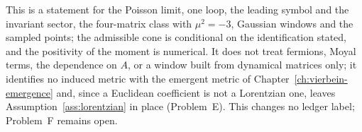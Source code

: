 This is a statement for the Poisson limit, one loop, the leading symbol and the invariant sector, the four-matrix class with \(\mu^2=-3\), Gaussian windows and the sampled points; the admissible cone is conditional on the identification stated, and the positivity of the moment is numerical. It does not treat fermions, Moyal terms, the dependence on \(A\), or a window built from dynamical matrices only; it identifies no induced metric with the emergent metric of Chapter~\ref{ch:vierbein-emergence} and, since a Euclidean coefficient is not a Lorentzian one, leaves Assumption~\ref{ass:lorentzian} in place (Problem~E). This changes no ledger label; Problem~F remains open.
